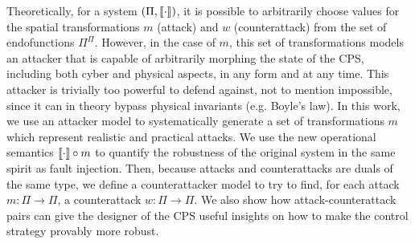Theoretically, for a system $(\Pi,{{{\llbracket\cdot\rrbracket}}})$, %
it is possible to arbitrarily choose values for the spatial transformations $m$ (attack) and $w$ (counterattack) from the set of endofunctions $\Pi^{\Pi}$.  However, in the case of $m$, this set of transformations models an attacker that is capable of arbitrarily morphing the state of the CPS, including both cyber and physical aspects, in any form and at any time. This attacker is trivially too powerful to defend against, not to mention impossible, since it can in theory bypass physical invariants (e.g. Boyle's law). In this work, we  use an attacker model to systematically generate a set of transformations $m$ which represent realistic and practical attacks. We use the new operational semantics ${{{\llbracket\cdot\rrbracket}}}\circ m$ to quantify the robustness of the original system in the same spirit as fault injection. Then, because attacks and counterattacks are duals of the same type, we define a counterattacker model to try to find, for each attack $m\colon\Pi\rightarrow\Pi$, a counterattack $w\colon\Pi\rightarrow\Pi$. We also show how attack-counterattack pairs can give the designer of the CPS useful insights on how to make the control strategy provably more robust. %



